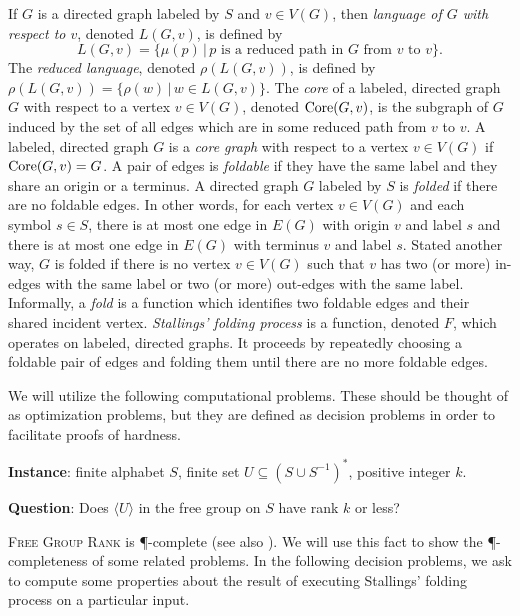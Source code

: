 \documentclass{article}
\newcommand{\FGR}{\textsc{Free Group Rank}}
\newcommand{\gen}[1]{\langle #1 \rangle}
\newcommand{\Core}{\textnormal{Core}}
\newcommand{\Instance}{\textbf{Instance}: }
\newcommand{\Question}{\textbf{Question}: }
\newcommand{\instanceindent}{%
  \setlength{\leftskip}{2em}%
  \setlength{\parindent}{-2em}}
\newcommand{\questionindent}{%
  \setlength{\leftskip}{2em}%
  \setlength{\parindent}{-2em}}
\begin{document}
If $G$ is a directed graph labeled by $S$ and $v \in V(G)$, then \emph{language of $G$ with respect to $v$}, denoted $L(G, v)$, is defined by
\begin{equation*}
  L(G, v) = \{ \mu(p) \, | \, p \text{ is a reduced path in } G \text{ from } v \text{ to } v\}.
\end{equation*}
The \emph{reduced language}, denoted $\rho(L(G, v))$, is defined by $\rho(L(G, v)) = \{ \rho(w) \, | \, w \in L(G, v) \}$.
The \emph{core} of a labeled, directed graph $G$ with respect to a vertex $v \in V(G)$, denoted $\Core(G, v)$, is the subgraph of $G$ induced by the set of all edges which are in some reduced path from $v$ to $v$.
A labeled, directed graph $G$ is a \emph{core graph} with respect to a vertex $v \in V(G)$ if $\Core(G, v) = G$.
A pair of edges is \emph{foldable} if they have the same label and they share an origin or a terminus.
A directed graph $G$ labeled by $S$ is \emph{folded} if there are no foldable edges.
In other words, for each vertex $v \in V(G)$ and each symbol $s \in S$, there is at most one edge in $E(G)$ with origin $v$ and label $s$ and there is at most one edge in $E(G)$ with terminus $v$ and label $s$.
Stated another way, $G$ is folded if there is no vertex $v \in V(G)$ such that $v$ has two (or more) in-edges with the same label or two (or more) out-edges with the same label.
Informally, a \emph{fold} is a function which identifies two foldable edges and their shared incident vertex.
\emph{Stallings' folding process} is a function, denoted $F$, which operates on labeled, directed graphs.
It proceeds by repeatedly choosing a foldable pair of edges and folding them until there are no more foldable edges.

We will utilize the following computational problems.
These should be thought of as optimization problems, but they are defined as decision problems in order to facilitate proofs of hardness.
\begin{definition}[\FGR]
  \mbox{}

  \instanceindent
  \Instance finite alphabet $S$, finite set $U \subseteq (S \cup S^{-1})^*$, positive integer $k$.

  \questionindent
  \Question Does $\gen{U}$ in the free group on $S$ have rank $k$ or less?
\end{definition}

\FGR{} is \P-complete \cite[Theorem~4.9]{am84} (see also \cite[Problem~A.8.11]{ghr95}).
We will use this fact to show the \P-completeness of some related problems.
In the following decision problems, we ask to compute some properties about the result of executing Stallings' folding process on a particular input.
\end{document}
